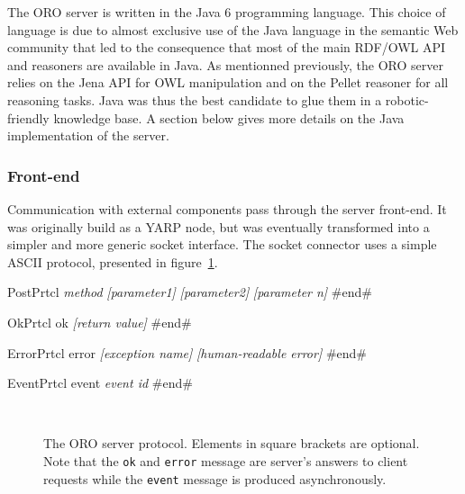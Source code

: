 The ORO server is written in the Java 6 programming language. This choice of
language is due to almost exclusive use of the Java language in the semantic
Web community that led to the consequence that most of the main RDF/OWL API and
reasoners are available in Java. As mentionned previously, the ORO server
relies on the Jena API for OWL manipulation and on the Pellet reasoner for all
reasoning tasks. Java was thus the best candidate to glue them in a
robotic-friendly knowledge base. A section below gives more details on the Java
implementation of the server.

\subsubsection{Front-end}
\label{sect|frontend}

Communication with external components pass through the server front-end.  It
was originally build as a YARP node, but was eventually transformed into a
simpler and more generic socket interface.  The socket connector uses a simple
ASCII protocol, presented in figure~\ref{fig|oro-protocol}.

\begin{SaveVerbatim}[frame=single, commandchars=\\\{\}]{PostPrtcl}
\emph{method}
\emph{[parameter1]}
\emph{[parameter2]}
\emph{[parameter n]}
#end#
\end{SaveVerbatim}

\begin{SaveVerbatim}[frame=single, commandchars=\\\{\}]{OkPrtcl}
ok
\emph{[return value]}
#end#
\end{SaveVerbatim}

\begin{SaveVerbatim}[frame=single, commandchars=\\\{\}]{ErrorPrtcl}
error
\emph{[exception name]}
\emph{[human-readable error]}
#end#
\end{SaveVerbatim}

\begin{SaveVerbatim}[frame=single, commandchars=\\\{\}]{EventPrtcl}
event
\emph{event id}
#end#
\end{SaveVerbatim}

\begin{figure}
\centering

 \\

\caption{The ORO server protocol. Elements in square brackets are optional.
Note that the {\tt ok} and {\tt error} message are server's answers to client
requests while the {\tt event} message is produced asynchronously.}

\label{fig|oro-protocol}

\end{figure}

